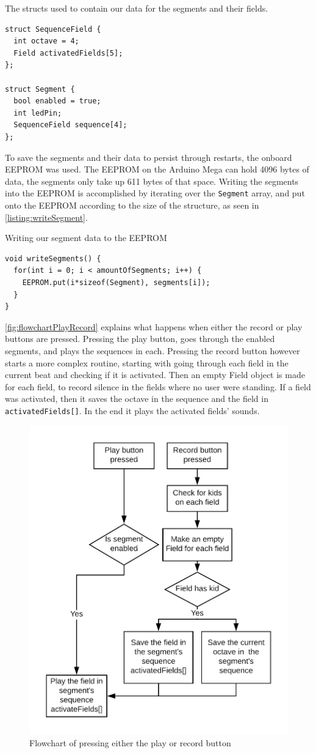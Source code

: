 		\begin{listing}[H]
			\caption{The structs used to contain our data for the segments and their fields.}
			\label{listing:structs}
			\begin{verbatim}
struct SequenceField {
  int octave = 4;
  Field activatedFields[5];
};

struct Segment {
  bool enabled = true;
  int ledPin;
  SequenceField sequence[4];
};
			\end{verbatim}
		\end{listing}
		\noindent
		To save the segments and their data to persist through restarts, the onboard EEPROM was used. The EEPROM on the Arduino Mega can hold 4096 bytes of data, the segments only take up 611 bytes of that space. Writing the segments into the EEPROM is accomplished by iterating over the \texttt{Segment} array, and put onto the EEPROM according to the size of the structure, as seen in \autoref{listing:writeSegment}.
		\begin{listing}[H]
			\caption{Writing our segment data to the EEPROM}
			\label{listing:writeSegment}
			\begin{verbatim}
void writeSegments() {
  for(int i = 0; i < amountOfSegments; i++) {
	EEPROM.put(i*sizeof(Segment), segments[i]);
  }
}
			\end{verbatim}
		\end{listing}
		\noindent
		\autoref{fig:flowchartPlayRecord} explains what happens when either the record or play buttons are pressed. Pressing the play button, goes through the enabled segments, and plays the sequences in each. Pressing the record button however starts a more complex routine, starting with going through each field in the current beat and checking if it is activated. Then an empty Field object is made for each field, to record silence in the fields where no user were standing. If a field was activated, then it saves the octave in the sequence and the field in \texttt{activatedFields[]}. In the end it plays the activated fields' sounds.
		\begin{figure}[H]
			\centering
			\includegraphics[width=.5\linewidth]{figure/Implementation/flowchartPlayRecord}
			\caption{Flowchart of pressing either the play or record button}
			\label{fig:flowchartPlayRecord}
			\end{figure}
	
